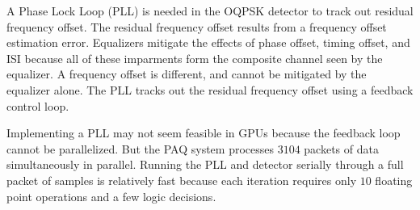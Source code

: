 A Phase Lock Loop (PLL) is needed in the OQPSK detector to track out residual frequency offset.
The residual frequency offset results from a frequency offset estimation error.
Equalizers mitigate the effects of phase offset, timing offset, and ISI because all of these imparments form the  composite channel seen by the equalizer.
A frequency offset is different, and cannot be mitigated by the equalizer alone.
The PLL tracks out the residual frequency offset using a feedback control loop.

Implementing a PLL may not seem feasible in GPUs because the feedback loop cannot be parallelized.
But the PAQ system processes $3104$ packets of data simultaneously in parallel.
Running the PLL and detector serially through a full packet of samples is relatively fast because each iteration requires only $10$ floating point operations and a few logic decisions.
%
%
